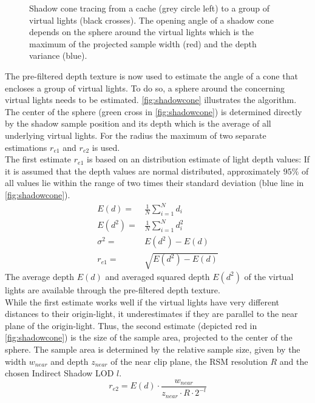 \documentclass[thesis.tex]{subfiles}
\begin{document}
\begin{figure}[h]
	\centering
	\caption{Shadow cone tracing from a cache (grey circle left) to a group of virtual lights (black crosses). The opening angle of a shadow cone depends on the sphere around the virtual lights which is the maximum of the projected sample width (red) and the depth variance (blue).} \label{fig:shadowcone}
\end{figure}
The pre-filtered depth texture is now used to estimate the angle of a cone that encloses a group of virtual lights.
To do so, a sphere around the concerning virtual lights needs to be estimated.
\autoref{fig:shadowcone} illustrates the algorithm.
The center of the sphere (green cross in \autoref{fig:shadowcone}) is determined directly by the shadow sample position and its depth which is the average of all underlying virtual lights.
For the radius the maximum of two separate estimations $r_{e1}$ and $r_{e2}$ is used.
\\
The first estimate $r_{e1}$ is based on an distribution estimate of light depth values:
If it is assumed that the depth values are normal distributed, approximately $95\%$ of all values lie within the range of two times their standard deviation (blue line in \autoref{fig:shadowcone}).
\begin{align}
E(d) =& \frac{1}{N} \sum\limits_{i=1}^{N} d_i\\
E(d^2) =& \frac{1}{N} \sum\limits_{i=1}^{N} d_i^2\\
\sigma^2 =& E(d^2) - E(d)\\
r_{e1} =& \sqrt{E(d^2) - E(d)}
\end{align}
The average depth $E(d)$ and averaged squared depth $E(d^2)$ of the virtual lights are available through the pre-filtered depth texture.
\\
While the first estimate works well if the virtual lights have very different distances to their origin-light, it underestimates if they are parallel to the near plane of the origin-light.
Thus, the second estimate (depicted red in \autoref{fig:shadowcone}) is the size of the sample area, projected to the center of the sphere.
The sample area is determined by the relative sample size, given by the width $w_{near}$ and depth $z_{near}$ of the near clip plane, the RSM resolution $R$ and the chosen Indirect Shadow LOD $l$.
\begin{equation}
r_{e2} = E(d) \cdot \frac{w_{near}}{z_{near} \cdot R \cdot 2^{-l} }
\end{equation}
\end{document}
